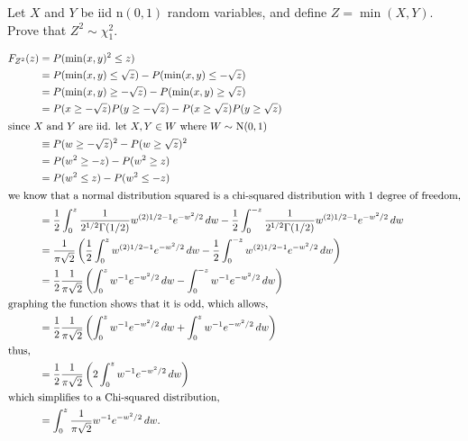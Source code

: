 \documentclass[12pt,letterpaper]{exam}
\begin{document}
\begin{questions}
\begin{solution}
\begin{parts}
			
		\end{parts}
	\end{solution}
	
	\setcounter{question}{21}
	\question 
	Let \(X\) and \(Y\) be iid n\((0, 1)\) random variables, 
	and define \(Z = \min(X,Y)\). Prove that \(Z^2 \sim \chi^2_1 \).
	
	\begin{solution}
		\begin{align*}
			F_{Z^2}(z) 
			&= P(\min(x,y)^2\leq z) \\
			&= P(\min(x,y)\leq \sqrt{z}) - P(\min(x,y)\leq -\sqrt{z}) \\
			&= P(\min(x,y)\geq -\sqrt{z}) - P(\min(x,y)\geq \sqrt{z}) \\
			&= P(x\geq -\sqrt{z})P(y\geq -\sqrt{z}) - P(x\geq \sqrt{z})P(y\geq \sqrt{z}) \\
			\intertext{since \(X\) and \(Y\) are iid. let \(X,Y\in W\) where \(W\sim\) N\((0,1)\)}
			&\equiv P(w\geq -\sqrt{z})^2 - P(w\geq \sqrt{z})^2 \\
			&= P(w^2\geq -z) - P(w^2\geq z) \\
			&= P(w^2\leq z) - P(w^2\leq -z) \\
			\intertext{we know that a normal distribution squared is a chi-squared distribution with \(1\) degree of freedom,}
			&=\frac{1}{2} \int_{0}^{z} \frac{1}{2^{1/2}\Gamma(1/2)}w^{(2)1/2-1}e^{-w^2/2} \,dw
			- \frac{1}{2}\int_{0}^{-z} \frac{1}{2^{1/2}\Gamma(1/2)}w^{(2)1/2-1}e^{-w^2/2} \,dw \\
			&= \frac{1}{\pi\sqrt{2}}\left( \frac{1}{2}\int_{0}^{z} w^{(2)1/2-1}e^{-w^2/2} \,dw
			- \frac{1}{2}\int_{0}^{-z} w^{(2)1/2-1}e^{-w^2/2} \,dw \right) \\
			&= \frac{1}{2}\frac{1}{\pi\sqrt{2}}\left( \int_{0}^{z} w^{-1}e^{-w^2/2} \,dw - \int_{0}^{-z} w^{-1}e^{-w^2/2} \,dw \right) \\
			\intertext{graphing the function shows that it is odd, which allows,}
			&= \frac{1}{2}\frac{1}{\pi\sqrt{2}}\left( \int_{0}^{z} w^{-1}e^{-w^2/2} \,dw + \int_{0}^{z} w^{-1}e^{-w^2/2} \,dw \right) \\
			\intertext{thus,}
			&= \frac{1}{2}\frac{1}{\pi\sqrt{2}}\left( 2\int_{0}^{z} w^{-1}e^{-w^2/2} \,dw  \right) \\
			\intertext{which simplifies to a Chi-squared distribution,}
			&= \int_{0}^{z} \frac{1}{\pi\sqrt{2}} w^{-1}e^{-w^2/2} \,dw.  \\
		\end{align*}
	\end{solution}


\end{questions}
\end{document}
